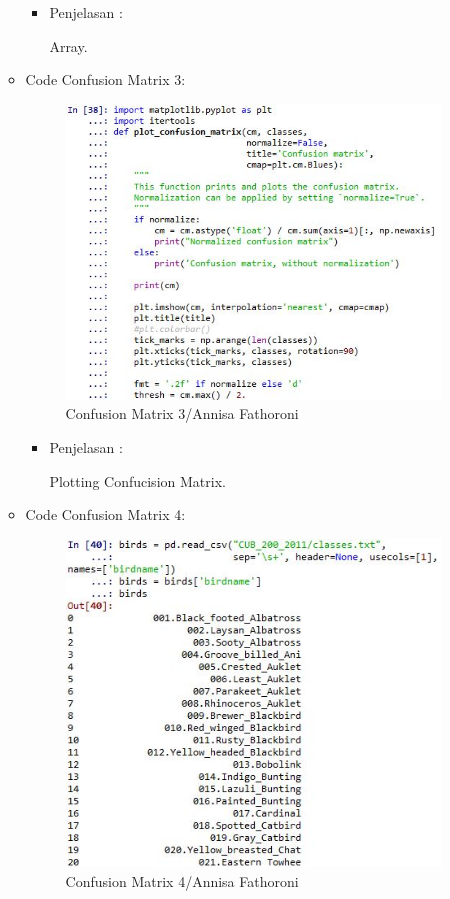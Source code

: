 \begin{enumerate}
\begin{itemize}
\begin{itemize}
\item Penjelasan :

Array.

\end{itemize}
\item Code Confusion Matrix 3:

\begin{figure}[ht]
\centering
\includegraphics[scale=0.6]{figures/Chapter3AnnisaFathoroni30.jpg}
\caption{Confusion Matrix 3/Annisa Fathoroni}
\label{contoh}
\end{figure}

\begin{itemize}
\item Penjelasan :

Plotting Confucision Matrix.

\end{itemize}
\item Code Confusion Matrix 4:

\begin{figure}[ht]
\centering
\includegraphics[scale=0.6]{figures/Chapter3AnnisaFathoroni31.jpg}
\caption{Confusion Matrix 4/Annisa Fathoroni}
\label{contoh}
\end{figure}


\end{itemize}
\end{enumerate}

